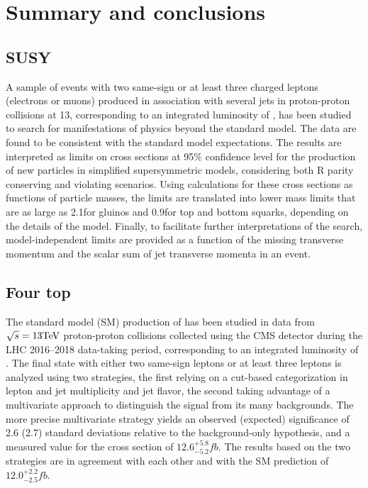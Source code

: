 \chapter{Summary and conclusions}


\section{SUSY}

A sample of events with two same-sign or at least three charged leptons
(electrons or muons) produced in association with several jets in
proton-proton collisions at 13\TeV, corresponding to an integrated luminosity
of \sslumi, has been studied to search for manifestations of physics beyond
the standard model. The data are found to be consistent with the standard
model expectations. The results are interpreted as limits on cross sections
at 95\% confidence level for the production of new particles in simplified
supersymmetric models, considering both R parity conserving and violating
scenarios. Using calculations for these cross sections as functions of
particle masses, the limits are translated into lower mass limits that are as
large as 2.1\TeV for gluinos and 0.9\TeV for top and bottom squarks,
depending on the details of the model. Finally, to facilitate further interpretations of the search, model-independent
limits are provided as a function of the missing transverse momentum and the scalar sum of jet transverse momenta in an event.

\section{Four top}

The standard model (SM) production of \tttt has been studied in data from
$\sqrt{s} = 13\text{TeV}$ proton-proton collisions collected using the CMS
detector during the LHC 2016--2018 data-taking period, corresponding to an
integrated luminosity of \sslumi. The final state with either two same-sign
leptons or at least three leptons is analyzed using two strategies, the
first relying on a cut-based categorization in lepton and jet multiplicity
and jet flavor, the second taking advantage of a multivariate approach to
distinguish the \tttt signal from its many backgrounds. The more precise
multivariate strategy yields an observed (expected) significance of 2.6
(2.7) standard deviations relative to the background-only hypothesis, and a
measured value for the \tttt cross section of $12.6^{+5.8}_{-5.2}\unit{fb}$.
The results based on the two strategies are in agreement with each other and
with the SM prediction of $12.0^{+2.2}_{-2.5}\unit{fb}$.

